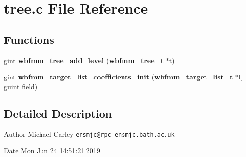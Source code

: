 \section{tree.\+c File Reference}
\label{tree_8c}
\subsection*{Functions}
\begin{DoxyCompactItemize}
\item 
gint {\bf wbfmm\+\_\+tree\+\_\+add\+\_\+level} ({\bf wbfmm\+\_\+tree\+\_\+t} $\ast$t)
\item 
gint {\bf wbfmm\+\_\+target\+\_\+list\+\_\+coefficients\+\_\+init} ({\bf wbfmm\+\_\+target\+\_\+list\+\_\+t} $\ast$l, guint field)
\end{DoxyCompactItemize}


\subsection{Detailed Description}
\begin{DoxyAuthor}{Author}
Michael Carley {\tt ensmjc@rpc-\/ensmjc.\+bath.\+ac.\+uk} 
\end{DoxyAuthor}
\begin{DoxyDate}{Date}
Mon Jun 24 14\+:51\+:21 2019 
\end{DoxyDate}
